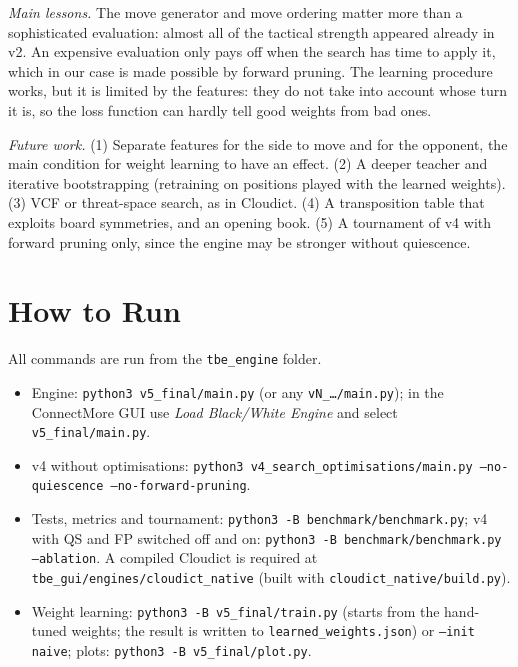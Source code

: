 \documentclass[a4paper,10pt,twocolumn]{article}
\newcommand{\code}[1]{\texttt{#1}}
\begin{document}
\emph{Main lessons.} The move generator and move ordering matter more than a sophisticated evaluation: almost all of the tactical strength appeared already in v2. An expensive evaluation only pays off when the search has time to apply it, which in our case is made possible by forward pruning. The learning procedure works, but it is limited by the features: they do not take into account whose turn it is, so the loss function can hardly tell good weights from bad ones.

\emph{Future work.} (1) Separate features for the side to move and for the opponent, the main condition for weight learning to have an effect. (2) A deeper teacher and iterative bootstrapping (retraining on positions played with the learned weights). (3) VCF or threat-space search, as in Cloudict. (4) A transposition table that exploits board symmetries, and an opening book. (5) A tournament of v4 with forward pruning only, since the engine may be stronger without quiescence.




\appendix
\section{How to Run}
\raggedright
All commands are run from the \code{tbe\_engine} folder.
\begin{itemize}\itemsep0pt
\item Engine: \code{python3 v5\_final/main.py} (or any \code{vN\_\ldots/main.py}); in the ConnectMore GUI use \emph{Load Black/White Engine} and select \code{v5\_final/main.py}.
\item v4 without optimisations: \code{python3 v4\_search\_optimisations/main.py --no-quiescence --no-forward-pruning}.
\item Tests, metrics and tournament: \code{python3 -B benchmark/benchmark.py}; v4 with QS and FP switched off and on: \code{python3 -B benchmark/benchmark.py --ablation}. A compiled Cloudict is required at \code{tbe\_gui/engines/cloudict\_native} (built with \code{cloudict\_native/build.py}).
\item Weight learning: \code{python3 -B v5\_final/train.py} (starts from the hand-tuned weights; the result is written to \code{learned\_weights.json}) or \code{--init naive}; plots: \code{python3 -B v5\_final/plot.py}.
\end{itemize}

\onecolumn
\end{document}
